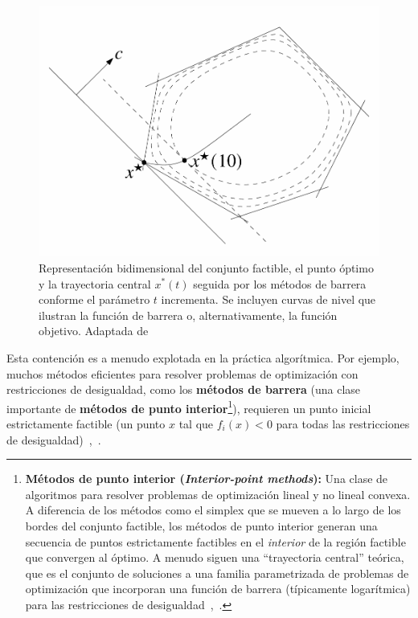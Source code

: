\begin{figure}
    \centering
    \includegraphics[width=0.75\linewidth]{img//marcoTeorico/optimizacion_fig3.png}
    \caption{Representación bidimensional del conjunto factible, el punto óptimo y la trayectoria central \( x^*(t) \) seguida por los métodos de barrera conforme el parámetro \( t \) incrementa. Se incluyen curvas de nivel que ilustran la función de barrera o, alternativamente, la función objetivo. Adaptada de~\cite[p.~361]{BoydVandenbergheSlides2023}}%
    \label{fig:optimization3}
\end{figure}

Esta contención es a menudo explotada en la práctica algorítmica. Por ejemplo, muchos métodos eficientes para resolver
problemas de optimización con restricciones de desigualdad, como los \textbf{métodos de barrera} (una clase importante
de \textbf{métodos de punto interior}\footnote{\textbf{Métodos de punto interior (\textit{Interior-point methods}):}
Una clase de algoritmos para resolver problemas de optimización lineal y no lineal convexa. A diferencia de los métodos
como el simplex que se mueven a lo largo de los bordes del conjunto factible, los métodos de punto interior generan una
secuencia de puntos estrictamente factibles en el \textit{interior} de la región factible que convergen al óptimo. A menudo
siguen una ``trayectoria central'' teórica, que es el conjunto de soluciones a una familia parametrizada de problemas de
optimización que incorporan una función de barrera (típicamente logarítmica) para las restricciones de desigualdad~\cite[Cap.~11]{BoydVandenberghe2004},~\cite[Cap.~9 y 11]{BoydVandenbergheSlides2023}.}), requieren un punto inicial
estrictamente factible (un punto $x$ tal que $f_i(x) < 0$ para todas las restricciones de desigualdad)~\cite[pp.~561, 568]{BoydVandenberghe2004},~\cite[pp.~355, 367]{BoydVandenbergheSlides2023}.

